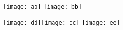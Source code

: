 \documentclass{article}
\begin{document}
  \texttt{[image: aa]}
        \texttt{[image: bb]}
  
   \texttt{[image: dd]}\texttt{[image: cc]}
\texttt{[image: ee]}
\end{document}
